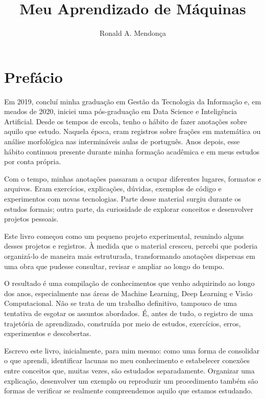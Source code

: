 \documentclass[a4paper,12pt,openany]{book}
\title{Meu Aprendizado de Máquinas}
\author{Ronald A. Mendonça}
\date{\the\year} %
\begin{document}
\maketitle{}
\tableofcontents{}

\chapter*{Prefácio}

Em 2019, concluí minha graduação em Gestão da Tecnologia da Informação e, em meados de 2020, iniciei uma pós-graduação em Data Science e Inteligência Artificial. Desde os tempos de escola, tenho o hábito de fazer anotações sobre aquilo que estudo. Naquela época, eram registros sobre frações em matemática ou análise morfológica nas intermináveis aulas de português. Anos depois, esse hábito continuou presente durante minha formação acadêmica e em meus estudos por conta própria.

Com o tempo, minhas anotações passaram a ocupar diferentes lugares, formatos e arquivos. Eram exercícios, explicações, dúvidas, exemplos de código e experimentos com novas tecnologias. Parte desse material surgiu durante os estudos formais; outra parte, da curiosidade de explorar conceitos e desenvolver projetos pessoais.

Este livro começou como um pequeno projeto experimental, reunindo alguns desses projetos e registros. À medida que o material cresceu, percebi que poderia organizá-lo de maneira mais estruturada, transformando anotações dispersas em uma obra que pudesse consultar, revisar e ampliar ao longo do tempo.

O resultado é uma compilação de conhecimentos que venho adquirindo ao longo dos anos, especialmente nas áreas de Machine Learning, Deep Learning e Visão Computacional. Não se trata de um trabalho definitivo, tampouco de uma tentativa de esgotar os assuntos abordados. É, antes de tudo, o registro de uma trajetória de aprendizado, construída por meio de estudos, exercícios, erros, experimentos e descobertas.

Escrevo este livro, inicialmente, para mim mesmo: como uma forma de consolidar o que aprendi, identificar lacunas no meu conhecimento e estabelecer conexões entre conceitos que, muitas vezes, são estudados separadamente. Organizar uma explicação, desenvolver um exemplo ou reproduzir um procedimento também são formas de verificar se realmente compreendemos aquilo que estamos estudando.
\end{document}
